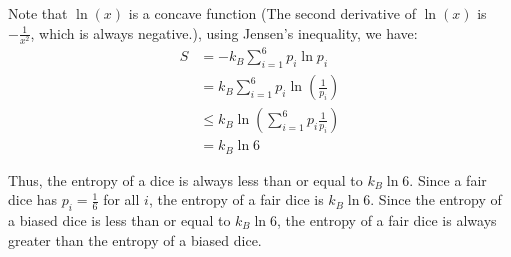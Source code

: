 \documentclass[11pt]{article}
\begin{document}
Note that $\ln(x)$ is a concave function (The second derivative of $\ln(x)$ is $-\frac{1}{x^2}$, which is always negative.), using Jensen's inequality, we have:
\begin{align*}
    S &= -k_B\sum_{i=1}^6p_i\ln p_i\\
      &= k_B\sum_{i=1}^6p_i\ln\left(\frac{1}{p_i}\right)\\
      &\leq k_B\ln\left(\sum_{i=1}^6p_i\frac{1}{p_i}\right)\\
      &= k_B\ln 6
\end{align*}

Thus, the entropy of a dice is always less than or equal to $k_B\ln 6$. Since a fair dice has $p_i=\frac{1}{6}$ for all $i$, the entropy of a fair dice is $k_B\ln 6$. Since the entropy of a biased dice is less than or equal to $k_B\ln 6$, the entropy of a fair dice is always greater than the entropy of a biased dice.
\end{document}

